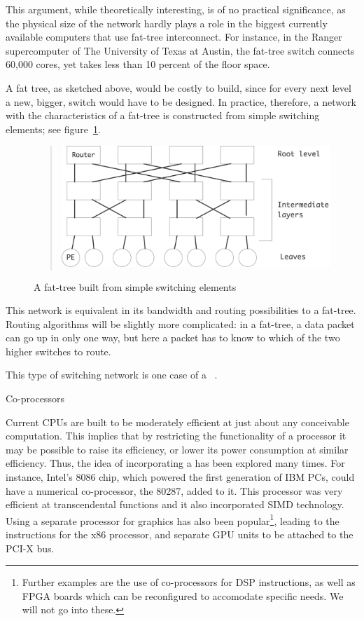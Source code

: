 This argument, while theoretically interesting, is of no practical
significance, as the physical size of the network hardly plays a role
in the biggest currently available computers that use fat-tree
interconnect. For instance, in the Ranger supercomputer of The
University of Texas at Austin, the fat-tree switch connects 60,000
cores, yet takes less than 10 percent of the floor space.

A fat tree, as sketched above, would be costly to build, since for
every next level a new, bigger, switch would have to be designed. In
practice, therefore, a network with the characteristics of a fat-tree
is constructed from simple switching elements; see
figure~\ref{fig:fattreeclos}.
\begin{figure}
  \begin{quote}
    \includegraphics[scale=.11]{graphics-public/fattree-clos}
  \end{quote}
  \caption{A fat-tree built from simple switching elements}
  \label{fig:fattreeclos}
\end{figure}
This network is equivalent in its bandwidth and routing possibilities
to a fat-tree. Routing algorithms will be slightly more complicated:
in a fat-tree, a data packet can go up in only one way, but here a
packet has to know to which of the two higher switches to route.

This type of switching network is one case of a ~\cite{Clos1953}.

 {Co-processors}

Current CPUs are built to be moderately efficient at just about any
conceivable computation. This implies that by restricting the
functionality of a processor it may be possible to raise its
efficiency, or lower its power consumption at similar
efficiency. Thus, the idea of incorporating a 
has been explored many times. For instance, Intel's 8086 chip, which
powered the first generation of IBM PCs, could have a numerical
co-processor, the 80287, added to it. This processor was very
efficient at transcendental functions and it also incorporated
\ac{SIMD} technology. Using a separate processor for graphics has also
been popular\footnote{Further examples are the use of co-processors
  for \ac{DSP} instructions, as well as \ac{FPGA} boards which can be
  reconfigured to accomodate specific needs. We will not go into
  these.}, leading to the  instructions for the x86 processor,
and separate \ac{GPU} units to be attached to the PCI-X bus.

